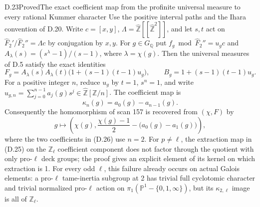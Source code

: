 \begin{statement}{D.23}{Proved}{The exact coefficient map from the profinite universal measure to every rational Kummer character}
Use the positive interval paths and the Ihara convention of D.20. Write
$c=[x,y]$, $\Lambda=\widehat{\mathbb Z}[[\widehat{\mathbb Z}^2]]$,
and let $s,t$ act on $\widehat F_2'/\widehat F_2''=\Lambda c$ by conjugation by $x,y$.
For $g\in G_{\mathbb Q}$ put $f_g\bmod\widehat F_2''=u_g c$ and
$A_\lambda(s)=(s^\lambda-1)/(s-1)$, where $\lambda=\chi(g)$.
Then the universal measures of D.5 satisfy the exact identities
\[
 F_g=A_\lambda(s)A_\lambda(t)
          \bigl(1+(s-1)(t-1)u_g\bigr),\qquad
 B_g=1+(s-1)(t-1)u_g.                                    \tag{D.24}
\]
For a positive integer $n$, reduce $u_g$ by $t=1$, $s^n=1$, and write
$u_{g,n}=\sum_{j=0}^{n-1}a_j(g)s^j\in\widehat{\mathbb Z}[\mathbb Z/n]$.
The coefficient map is
\[
 \kappa_n(g)=a_0(g)-a_{n-1}(g).                            \tag{D.25}
\]
Consequently the homomorphism of scan 157 is recovered from $(\chi,F)$ by
\[
 g\longmapsto
 \left(\chi(g),\frac{\chi(g)-1}{2}
                 -\bigl(a_0(g)-a_1(g)\bigr)\right),        \tag{D.26}
\]
where the two coefficients in (D.26) use $n=2$.
For $p\ne\ell$, the extraction map in (D.25) on the $\mathbb Z_\ell$ coefficient component does not factor through the quotient with only pro-$\ell$ deck groups; the proof gives an explicit element of its kernel on which extraction is 1. For every odd $\ell$, this failure already occurs on actual Galois elements: a pro-$\ell$ tame-inertia subgroup at 2 has trivial full cyclotomic character and trivial normalized pro-$\ell$ action on $\pi_1(\mathbb P^1-\{0,1,\infty\})$, but its $\kappa_{2,\ell}$ image is all of $\mathbb Z_\ell$.
\end{statement}
